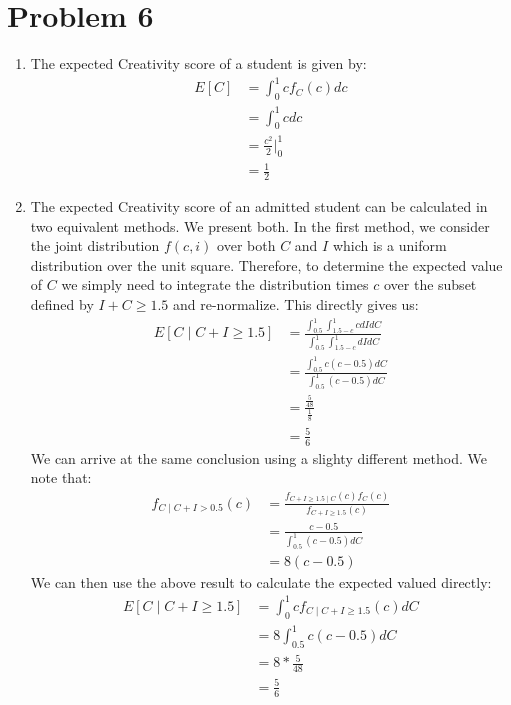\documentclass[12pt]{article}
\begin{document}
\pagebreak
\section*{Problem 6}

\begin{enumerate}
\item The expected Creativity score of a student is given by:
\begin{align*}
E[C] &= \int_{0}^1 c f_C(c) dc \\
&= \int_0^1 c dc \tag{$f_C(c) = 1$} \\
&= \frac{c^2}{2}\big\vert_0^1 \\
&= \frac{1}{2} 
\end{align*}
\item The expected Creativity score of an admitted student can be calculated in two equivalent methods. We present both. In the first method, we consider the joint distribution $f(c,i)$ over both $C$ and $I$ which is a uniform distribution over the unit square. Therefore, to determine the expected value of $C$ we simply need to integrate the distribution times $c$ over the subset defined by $I + C \geq 1.5$ and re-normalize. This directly gives us:
\begin{align*}
E[C \mid C + I \geq 1.5] &= \frac{\int_{0.5}^1\int_{1.5 - c}^1 c dIdC}{\int_{0.5}^1\int_{1.5 -c}^1dI dC} \\
&=\frac{\int_{0.5}^1c(c-0.5)dC}{\int_{0.5}^1 (c- 0.5) dC} \\
&= \frac{\frac{5}{48}}{\frac{1}{8}} \\
&= \frac{5}{6}
\end{align*}
We can arrive at the same conclusion using a slighty different method. We note that:
\begin{align*}
f_{C \mid C + I > 0.5}(c) &= \frac{f_{C+I \geq 1.5 \mid C}(c)f_{C}(c)}{f_{C + I \geq 1.5}(c)} \\
&= \frac{c-0.5}{\int_{0.5}^1 (c- 0.5) dC} \\
&= 8(c - 0.5) \tag{zero where $c \notin [0.5, 1]$}
\end{align*}
We can then use the above result to calculate the expected valued directly:
\begin{align*}
E[C \mid C + I \geq 1.5] &= \int_{0}^1 c f_{C \mid C + I \geq 1.5}(c) dC \\
&= 8\int_{0.5}^1 c(c-0.5) dC \\
&= 8*\frac{5}{48} \\
&= \frac{5}{6}
\end{align*}


\end{enumerate}
\end{document}
